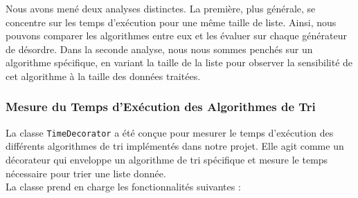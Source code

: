\documentclass[a4paper,12pt]{article}
\begin{document}
Nous avons mené deux analyses distinctes. La première, plus générale, se concentre sur les temps d'exécution pour une même taille de liste. Ainsi, nous pouvons comparer les algorithmes entre eux et les évaluer sur chaque générateur de désordre. Dans la seconde analyse, nous nous sommes penchés sur un algorithme spécifique, en variant la taille de la liste pour observer la sensibilité de cet algorithme à la taille des données traitées.

\subsubsection{Mesure du Temps d'Exécution des Algorithmes de Tri}

La classe \texttt{TimeDecorator} a été conçue pour mesurer le temps d'exécution des différents algorithmes de tri implémentés dans notre projet. Elle agit comme un décorateur qui enveloppe un algorithme de tri spécifique et mesure le temps nécessaire pour trier une liste donnée.\\



La classe prend en charge les fonctionnalités suivantes :
\end{document}
